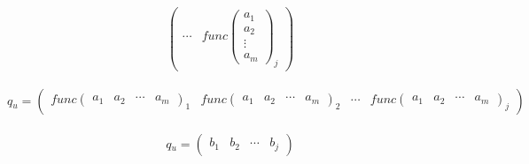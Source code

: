 \begin{center}
\[\begin{pmatrix}
            \cdots &
            \textit{func}\begin{pmatrix} a_{1}  \\  a_{2}  \\  \vdots   \\ a_{m} \end{pmatrix}_{j}
        \end{pmatrix}   
    \]
    \\
    \[  \textit{q$_{u}$} = 
        \begin{pmatrix}
            \textit{func}\begin{pmatrix} a_{1}  &  a_{2}  &  \cdots   & a_{m} \end{pmatrix}_{1} & 
            \textit{func}\begin{pmatrix} a_{1}  &  a_{2}  &  \cdots   & a_{m} \end{pmatrix}_{2} & 
            \cdots & 
            \textit{func}\begin{pmatrix} a_{1}  &  a_{2}  &  \cdots   & a_{m} \end{pmatrix}_{j}
        \end{pmatrix}
    \]
    \\
    \[  \textit{q$_{u}$} = 
        \begin{pmatrix}
            b_{1}  &  b_{2}  &  \cdots   & b_{j} 
        \end{pmatrix}
    \]
\end{center}    

